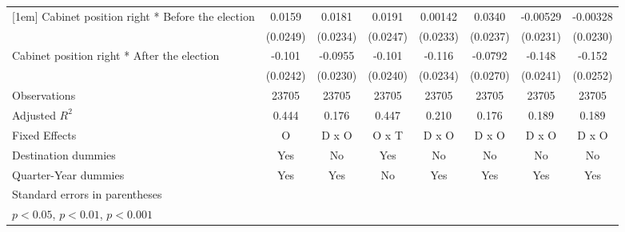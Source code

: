 \begin{table}[htbp]
\begin{tabular}{l*{7}{c}}
[1em]
Cabinet position right * Before the election&      0.0159         &      0.0181         &      0.0191         &     0.00142         &      0.0340         &    -0.00529         &    -0.00328         \\
                    &    (0.0249)         &    (0.0234)         &    (0.0247)         &    (0.0233)         &    (0.0237)         &    (0.0231)         &    (0.0230)         \\
[1em]
Cabinet position right * After the election&      -0.101\sym{***}&     -0.0955\sym{***}&      -0.101\sym{***}&      -0.116\sym{***}&     -0.0792\sym{**} &      -0.148\sym{***}&      -0.152\sym{***}\\
                    &    (0.0242)         &    (0.0230)         &    (0.0240)         &    (0.0234)         &    (0.0270)         &    (0.0241)         &    (0.0252)         \\
\hline
Observations        &       23705         &       23705         &       23705         &       23705         &       23705         &       23705         &       23705         \\
Adjusted \(R^{2}\)  &       0.444         &       0.176         &       0.447         &       0.210         &       0.176         &       0.189         &       0.189         \\
Fixed Effects       &           O         &       D x O         &       O x T         &       D x O         &       D x O         &       D x O         &       D x O         \\
Destination dummies &         Yes         &          No         &         Yes         &          No         &          No         &          No         &          No         \\
Quarter-Year dummies&         Yes         &         Yes         &          No         &         Yes         &         Yes         &         Yes         &         Yes         \\
\hline\hline
\multicolumn{8}{l}{\footnotesize Standard errors in parentheses}\\
\multicolumn{8}{l}{\footnotesize \sym{*} \(p<0.05\), \sym{**} \(p<0.01\), \sym{***} \(p<0.001\)}\\
\end{tabular}
\end{table}
